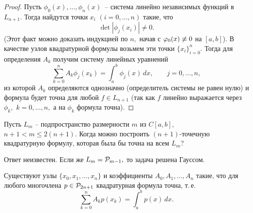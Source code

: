 \begin{proof}
Пусть $\phi_0(x),\dots ,\phi_n(x)$~-- система линейно
независимых функций в $L_{n+1}.$ Тогда найдутся точки $x_i$
$(i=0,\dots ,n)$ такие, что
\[
  \det |\phi_j(x_i)| \ne 0.
\]
{(Этот факт можно доказать индукцией по $n,$ начав с $\varphi_0(x)\not\equiv 0$ на $[a,b]$).}
В качестве узлов квадратурной формулы возьмем эти точки
$\{x_i\}_{i=0}^n.$
Тогда для определения $A_k$
получим систему линейных уравнений
\[
  \sum\limits_{k=0}^n A_k \phi_j(x_k)=\int_a^b
  \phi_j(x)\,dx,\qquad j=0,\ldots,n,
\]
из которой $A_k$
определяются однозначно (определитель системы не равен
нулю) и формула будет точна для любой $f \in L_{n+1}$
(так как $f$
линейно выражается через $\phi_k,$ $k=0, \dots ,n,$
а на $\phi_k$
формула точна).
\end{proof}

\begin{task} Пусть $L_m$ {-- подпространство размерности $m$ из $C[a,b],$}\   $n+1<
m \le 2(n+1).$ Когда можно построить {$(n+1)$-точечную} квадратурную формулу, которая
была бы точна на всем $L_m$?
\end{task}

Ответ неизвестен. Если же $L_m=\mathcal{P}_{m-1},$ то задача решена Гауссом.

\begin{teo}[К.\,Ф.\,Гаусс]
Существуют узлы $\{x_0,x_1,\dots ,x_n\}$ {и коэффициенты} $A_0,A_1,\dots, A_n$ такие,
что для любого многочлена $p \in \mathcal{P}_{2n+1}$ квадратурная формула точна, т.\,е.
\[
  \sum\limits_{k=0}^n A_k p(x_k)=\int_a^b p(x)\,dx.
\]
\end{teo}

